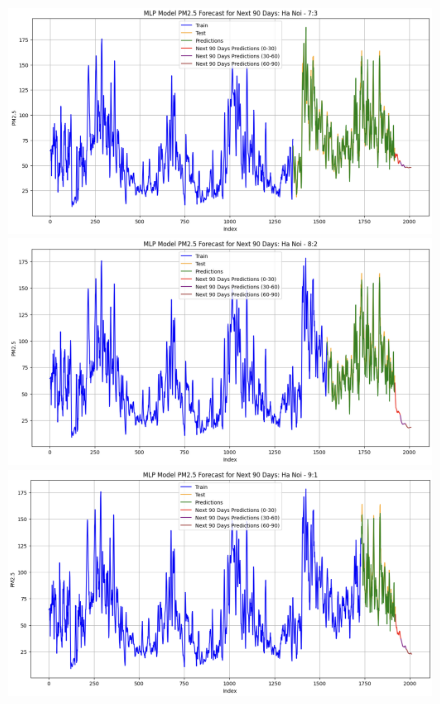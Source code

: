 \begin{figure}[H]
{\begin{adjustbox}{minipage=0.475\textwidth}
\begin{minipage}{0.3\textwidth}
            \end{minipage}\hfill
            \begin{minipage}{0.3\textwidth}
                \centering
                \includegraphics[width=\textwidth]{img/final/MLP/90D/MLP_7_3_HN.png}\\
                \includegraphics[width=\textwidth]{img/final/MLP/90D/MLP_8_2_HN.png}\\
                \includegraphics[width=\textwidth]{img/final/MLP/90D/MLP_9_1_HN.png}
            \end{minipage}\hfill

\end{adjustbox}}
\end{figure}
